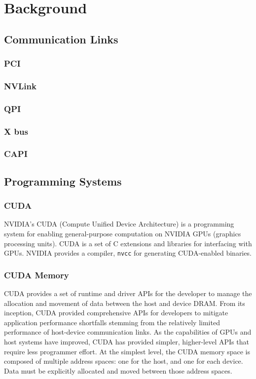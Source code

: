 \chapter{Background}


%
%
%
\section{Communication Links}

\subsection{PCI}
\subsection{NVLink}
\subsection{QPI}
\subsection{X bus}
\subsection{CAPI}

%
%
%
\section{Programming Systems}
\subsection{CUDA}
\label{sec:cuda}

NVIDIA's CUDA (Compute Unified Device Architecture) is a programming system for enabling general-purpose computation on NVIDIA GPUs (graphics processing units).
CUDA is a set of C extensions and libraries for interfacing with GPUs.
NVIDIA provides a compiler, \texttt{nvcc} for generating CUDA-enabled binaries.

\subsection{CUDA Memory}

CUDA provides a set of runtime and driver APIs for the developer to manage the allocation and movement of data between the host and device DRAM.
From its inception, CUDA provided comprehensive APIs for developers to mitigate application performance shortfalls stemming from the relatively limited performance of host-device communication links.
As the capabilities of GPUs and host systems have improved, CUDA has provided simpler, higher-level APIs that require less programmer effort.
At the simplest level, the CUDA memory space is composed of multiple address spaces: one for the host, and one for each device.
Data must be explicitly allocated and moved between those address spaces.

